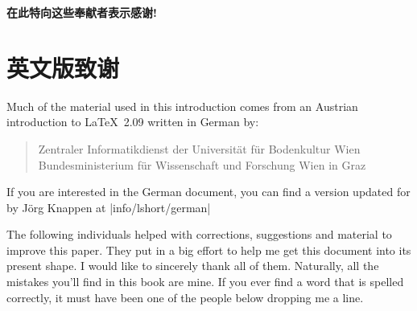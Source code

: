 \vspace{20pt}

\begin{flushright}
\textbf{在此特向这些奉献者表示感谢!}
\end{flushright}

\chapter{英文版致谢}

\noindent Much of the material used in this introduction comes from an
Austrian introduction to \LaTeX\ 2.09 written in German by:
\begin{verse}
%
{Zentraler Informatikdienst der Universit\"at f\"ur Bodenkultur Wien}
%
   {Bundesministerium f\"ur Wissenschaft und Forschung Wien}
%
   {in Graz}
\end{verse}

If you are interested in the German document, you can find a version
updated for \LaTeXe{} by J\"org Knappen at
\CTAN|info/lshort/german|

\newpage \noindent 
The following individuals helped with corrections, suggestions and
material to improve this paper. They put in a big effort to help me
get this document into its present shape. I would like to
sincerely thank all of them. Naturally, all the mistakes you'll find
in this book are mine. If you ever find a word that is spelled
correctly, it must have been one of the people below dropping me a
line.

